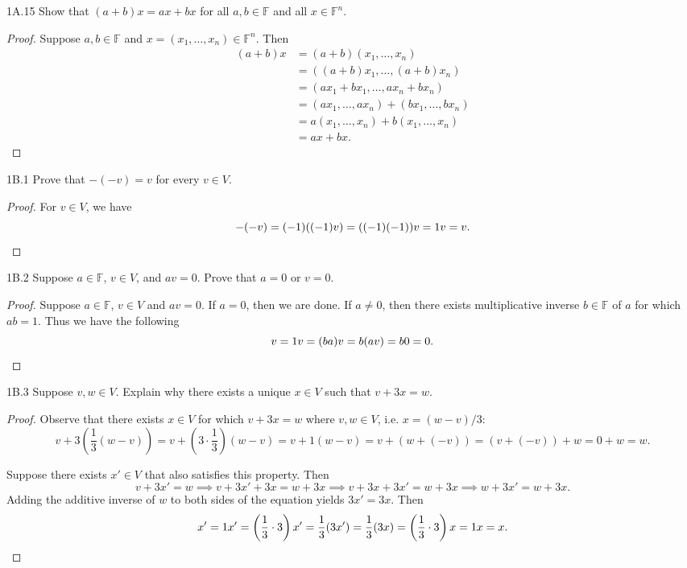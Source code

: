 \documentclass{exam}
\newcommand{\paren}[1]{\left(#1\right)}
\begin{document}
\begin{problem}{1A.15}
    Show that $(a+b)x = ax + bx$ for all $a,b\in\mathbb F$ and all $x\in\mathbb F^n$.
\end{problem}

\begin{proof}
    Suppose $a, b\in\mathbb F$ and $x=(x_1,\dots,x_n)\in\mathbb F^n$. Then
    \begin{align*}
        (a+b)x &= (a+b)(x_1,\dots,x_n)\\
        &= ((a+b)x_1,\dots,(a+b)x_n)\\
        &= (ax_1 + bx_1,\dots,ax_n+bx_n)\\
        &=(ax_1,\dots,ax_n) + (bx_1,\dots,bx_n)\\
        &=a(x_1,\dots,x_n) + b(x_1,\dots,x_n)\\
        &=ax + bx.
    \end{align*}
\end{proof}

\begin{problem}{1B.1}
    Prove that $-(-v)=v$ for every $v\in V$.
\end{problem}

\begin{proof}
    For $v\in V$, we have \[
    -(-v) = (-1)((-1)v) = ((-1)(-1))v = 1v = v. \qedhere
    \]
\end{proof}

\begin{problem}{1B.2}
    Suppose $a\in\mathbb F$, $v\in V$, and $av = 0$. Prove that $a=0$ or $v = 0$.
\end{problem}

\begin{proof}
    Suppose $a\in\mathbb F$, $v\in V$ and $av = 0$. If $a=0$, then we are done. If $a\neq 0$, then there exists multiplicative inverse $b\in\mathbb F$ of $a$ for which $ab = 1$. Thus we have the following \[
        v=1v=(ba)v=b(av)=b0=0. \qedhere
    \]
\end{proof}

\begin{problem}{1B.3}
    Suppose $v,w\in V$. Explain why there exists a unique $x\in V$ such that $v + 3x = w$.
\end{problem}

\begin{proof}
    Observe that there exists $x\in V$ for which $v + 3x = w$ where $v,w\in V$, i.e. $x = (w-v)/3$: \[
        v+3\paren{\frac13(w-v)} = v + \paren{3\cdot\frac13}(w-v) = v + 1(w-v) = v + (w+(-v)) = (v+(-v)) + w = 0 + w = w. 
    \]
    
    Suppose there exists $x'\in V$ that also satisfies this property. Then \[
    v + 3x' = w\implies v + 3x' + 3x = w + 3x \implies v + 3x + 3x' = w + 3x \implies w + 3x' = w + 3x.
    \]
    Adding the additive inverse of $w$ to both sides of the equation yields $3x' = 3x$. Then \[
    x' = 1x' = \paren{\frac13\cdot3}x' = \frac13(3x') = \frac13(3x) = \paren{\frac13\cdot3}x = 1x = x. \qedhere
    \]
\end{proof}
\end{document}
